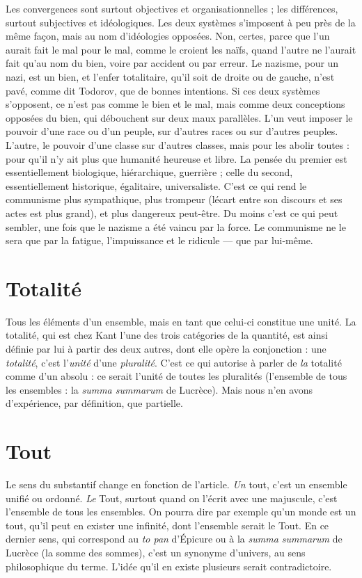 Les convergences sont surtout objectives et organisationnelles ; les différences,
surtout subjectives et idéologiques. Les deux systèmes s’imposent à peu
près de la même façon, mais au nom d’idéologies opposées. Non, certes, parce
que l’un aurait fait le mal pour le mal, comme le croient les naïfs, quand l’autre
ne l’aurait fait qu’au nom du bien, voire par accident ou par erreur. Le nazisme,
pour un nazi, est un bien, et l’enfer totalitaire, qu’il soit de droite ou de
gauche, n’est pavé, comme dit Todorov, que de bonnes intentions. Si ces deux
systèmes s'opposent, ce n’est pas comme le bien et le mal, mais comme deux
conceptions opposées du bien, qui débouchent sur deux maux parallèles. L’un
veut imposer le pouvoir d’une race ou d’un peuple, sur d’autres races ou sur
d’autres peuples. L'autre, le pouvoir d’une classe sur d’autres classes, mais
pour les abolir toutes : pour qu’il n’y ait plus que humanité heureuse et libre.
La pensée du premier est essentiellement biologique, hiérarchique, guerrière ;
celle du second, essentiellement historique, égalitaire, universaliste. C’est ce
qui rend le communisme plus sympathique, plus trompeur (lécart entre son
discours et ses actes est plus grand), et plus dangereux peut-être. Du moins
c’est ce qui peut sembler, une fois que le nazisme a été vaincu par la force. Le
communisme ne le sera que par la fatigue, l'impuissance et le ridicule — que
par lui-même.

\section{Totalité}
Tous les éléments d’un ensemble, mais en tant que celui-ci constitue
une unité. La totalité, qui est chez Kant l’une des trois catégories
de la quantité, est ainsi définie par lui à partir des deux autres, dont elle
opère la conjonction : une {\it totalité}, c’est l'{\it unité} d’une {\it pluralité}. C'est ce qui
autorise à parler de {\it la} totalité comme d’un absolu : ce serait l’unité de toutes les
pluralités (l’ensemble de tous les ensembles : la {\it summa summarum} de Lucrèce).
Mais nous n’en avons d’expérience, par définition, que partielle.

\section{Tout}
Le sens du substantif change en fonction de l’article. {\it Un} tout, c’est
un ensemble unifié ou ordonné. {\it Le} Tout, surtout quand on l'écrit
avec une majuscule, c’est l’ensemble de tous les ensembles. On pourra dire par
exemple qu’un monde est un tout, qu’il peut en exister une infinité, dont
l’ensemble serait le Tout. En ce dernier sens, qui correspond au {\it to pan} d’Épicure
ou à la {\it summa summarum} de Lucrèce (la somme des sommes), c’est un
synonyme d’univers, au sens philosophique du terme. L'idée qu’il en existe plusieurs
serait contradictoire.

